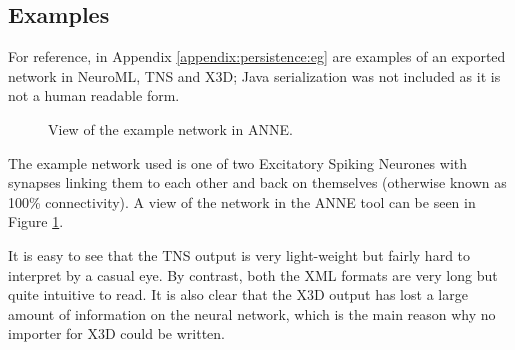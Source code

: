 \documentclass{acm_proc_article-sp}
\begin{document}
\subsection{Examples}
{
For reference, in Appendix \ref{appendix:persistence:eg} are examples of an exported network in NeuroML, TNS and X3D; Java serialization was not included as it is not a human readable form.
\begin{figure}[t]
\centering
{}
\caption{View of the example network in ANNE.}
\label{fig:persistence:egnet}
\end{figure}
The example network used is one of two Excitatory Spiking Neurones with synapses linking them to each other and back on themselves (otherwise known as 100\% connectivity). A view of the network in the ANNE tool can be seen in Figure \ref{fig:persistence:egnet}.

It is easy to see that the TNS output is very light{}-weight but fairly hard to
interpret by a casual eye. By contrast, both the XML formats are very long but quite intuitive to read. It is also clear that the X3D output has lost a large amount of information on the neural network, which is the main reason why no importer for X3D could be written.

}
\end{document}
